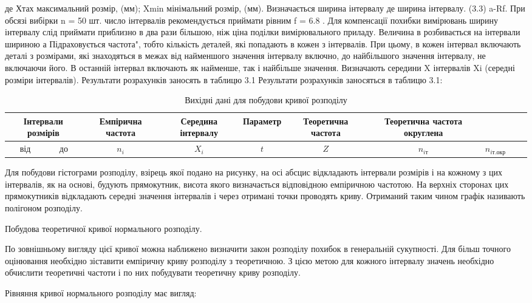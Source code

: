 де Хтах максимальний розмір, (мм);
Xmin мінімальний розмір, (мм).
Визначається ширина інтервалу
де ширина інтервалу.
(3.3)
a-Rf.
При обсязі вибірки n = 50 шт. число інтервалів рекомендується приймати рівним f = 6.8 . Для компенсації похибки вимірювань ширину інтервалу слід приймати приблизно в два рази більшою, ніж ціна поділки вимірювального
приладу. Величина в розбивається на інтервали шириною а
Підраховується частота", тобто кількість деталей, які попадають в кожен з інтервалів. При цьому, в кожен інтервал включають деталі з розмірами, які знаходяться в межах від найменшого значення інтервалу включно, до найбільшого значення інтервалу, не включаючи його. В останній інтервал
включають як найменше, так і найбільше значення. Визначають середини
X
інтервалів Xi (середні розміри інтервалів).
Результати розрахунків заносять в таблицю 3.1
Результати розрахунків заносяться в таблицю 3.1:

\begin{table}[H]
\centering
\caption{Вихідні дані для побудови кривої розподілу}
\begin{tabular}{|c|c|c|c|c|c|c|c|c|c|}
\hline
\multicolumn{2}{|c|}{Інтервали розмірів} & Емпірична частота & Середина інтервалу & Параметр & Теоретична частота & Теоретична частота округлена \\
\hline
від & до & $n_i$ & $X_i$ & $t$ & $Z$ & $n_{i\text{т}}$ & $n_{i\text{т.окр}}$ \\
\hline
\end{tabular}
\end{table}

Для побудови гістограми розподілу, взірець якої подано на рисунку, на осі абсцис відкладають інтервали розмірів і на кожному з цих інтервалів, як на основі, будують прямокутник, висота якого визначається відповідною емпіричною частотою. На верхніх сторонах цих прямокутників відкладають середні значення інтервалів і через отримані точки проводять криву. Отриманий таким чином графік називають полігоном розподілу.

Побудова теоретичної кривої нормального розподілу.

По зовнішньому вигляду цієї кривої можна наближено визначити закон розподілу похибок в генеральній сукупності. Для більш точного оцінювання необхідно зіставити емпіричну криву розподілу з теоретичною. З цією метою для кожного інтервалу значень необхідно обчислити теоретичні частоти і по них побудувати теоретичну криву розподілу.

Рівняння кривої нормального розподілу має вигляд:

